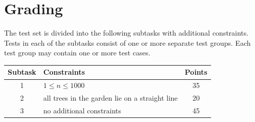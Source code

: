 \documentclass[10pt]{article}
\begin{document}

    \section*{Grading}
        
    The test set is divided into the following subtasks with additional constraints. Tests in each of the subtasks consist of one or more separate test groups. Each test group may contain one or more test cases.
    
    \begin{center}
        \begin{tabular}{ |c|p{9cm}|c| }
            \hline
            \textbf{Subtask} & \textbf{Constraints} & \textbf{Points}\\
            \hline
            1 & $1\leq n\leq 1000$ & 35\\
            \hline
            2 & all trees in the garden lie on a straight line & 20\\
            \hline
            3 & no additional constraints & 45\\
            \hline
        \end{tabular}
    \end{center}
    
\end{document}
